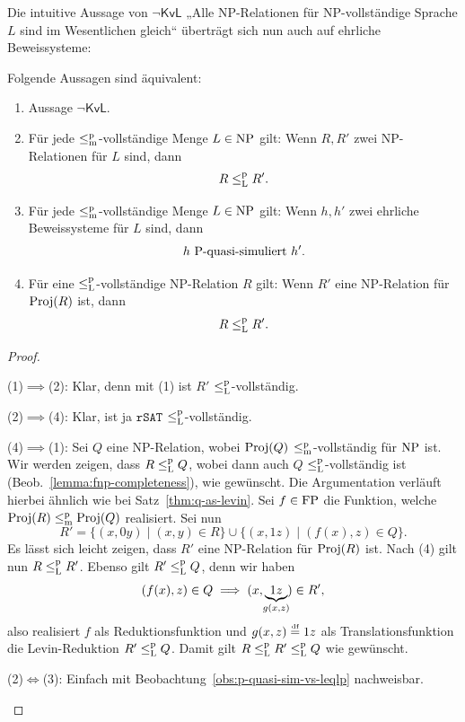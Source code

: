 Die intuitive Aussage von $\neg\mathsf{KvL}$ „Alle NP-Relationen für NP-vollständige Sprache $L$ sind im Wesentlichen gleich“ überträgt sich nun auch auf ehrliche Beweissysteme:
\begin{theorem}\label{thm:kvl-ps}
    Folgende Aussagen sind äquivalent:
    \begin{enumerate}
        \item Aussage $\neg\mathsf{KvL}$.
        \item Für jede $\leqmp$-vollständige Menge $L\in\NP$ gilt: Wenn $R, R'$ zwei NP-Relationen für $L$ sind, dann
            \[ R \leqlp R'. \]
        \item Für jede $\leqmp$-vollständige Menge $L\in\NP$ gilt: Wenn $h, h'$ zwei ehrliche Beweissysteme für $L$ sind, dann
            \[  \text{$h$ $\P$-quasi-simuliert $h'$}. \]
        \item Für eine $\leqlp$-vollständige NP-Relation $R$ gilt: Wenn $R'$ eine NP-Relation für $\Proj(R)$ ist, dann
            \[ R \leqlp R'. \]
    \end{enumerate}
\end{theorem}
\begin{proof}
    \begin{prooflist}
        \item (1)$\implies$(2): Klar, denn mit (1) ist $R'$ $\leqlp$-vollständig.
        \item (2)$\implies$(4): Klar, ist ja $\mathtt{rSAT}$ $\leqlp$-vollständig.
        \item (4)$\implies$(1): Sei $Q$ eine NP-Relation, wobei $\Proj(Q)$ $\leqmp$-vollständig für $\NP$ ist. Wir werden zeigen, dass $R\leqlp Q$, wobei dann auch $Q$ $\leqlp$-vollständig ist (Beob.~\ref{lemma:fnp-completeness}), wie gewünscht.
        Die Argumentation verläuft hierbei ähnlich wie bei Satz~\ref{thm:q-as-levin}. Sei $f\in\FP$ die Funktion, welche $\Proj(R)\leqmp \Proj(Q)$ realisiert.
        Sei nun
        \[ R' = \{ (x, 0y) \mid (x,y)\in R \} \cup \{ (x, 1z) \mid (f(x), z)\in Q \}. \]
        Es lässt sich leicht zeigen, dass $R'$ eine NP-Relation für $\Proj(R)$ ist.
        Nach (4) gilt nun $R \leqlp R'$. Ebenso gilt $R'\leqlp Q$, denn wir haben
\[ (f(x), z)\in Q \implies (x, \underbrace{1z}_{\mathclap{g(x,z)}})\in R', \]
        also realisiert $f$ als Reduktionsfunktion und $g(x,z)\defeq 1z$ als Translationsfunktion die Levin-Reduktion $R'\leqlp Q$. Damit gilt $R\leqlp R'\leqlp Q$ wie gewünscht.
        \item (2)$\iff$(3): Einfach mit Beobachtung~\ref{obs:p-quasi-sim-vs-leqlp} nachweisbar.
    \end{prooflist}
\end{proof}

